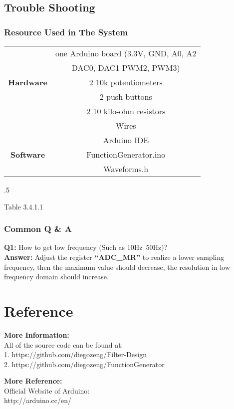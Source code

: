 \documentclass[12pt]{report}
\begin{document}
\section{\large Trouble Shooting}

\subsection{Resource Used in The System}
\begin{center}
    \begin{tabular}{||c|c||} \hline
      \ & one Arduino board (3.3V, GND, A0, A2\\ & DAC0, DAC1 PWM2, PWM3)\\ \textbf{Hardware} & 2 10k potentiometers\\ & 2 push buttons\\ & 2 10 kilo-ohm resistors\\ & Wires\\ \hline
      \ & Arduino IDE\\ \textbf{Software} & FunctionGenerator.ino\\ & Waveforms.h\\ \hline
    \end{tabular}
  \end{center}
  \moveleft.5\hoffset\centerline{\footnotesize Table 3.4.1.1}
\subsection{Common Q \& A}
\begin{flushleft}
\textbf{Q1: }
\textup{How to get low frequency (Such as 10Hz~50Hz)?\\}
\vspace{5pt}
\textbf{Answer:}
Adjust the register \textbf{``ADC\_MR''} to realize a lower sampling frequency, then the maximum value should decrease, the resolution in low frequency domain should increase.
\end{flushleft}
\chapter{\Large Reference}
\begin{flushleft}
\textbf{\large More Information:\\}
\vspace{3pt}
All of the source code can be found at:\\
1. https://github.com/diegozeng/Filter-Design\\
2. https://github.com/diegozeng/FunctionGenerator\\
\end{flushleft}
\vspace{20pt}
\begin{flushleft}
\textbf{\large More Reference:\\}
\vspace{3pt}
Official Website of Arduino:\\
http://arduino.cc/en/\\
\end{flushleft}
\end{document}
